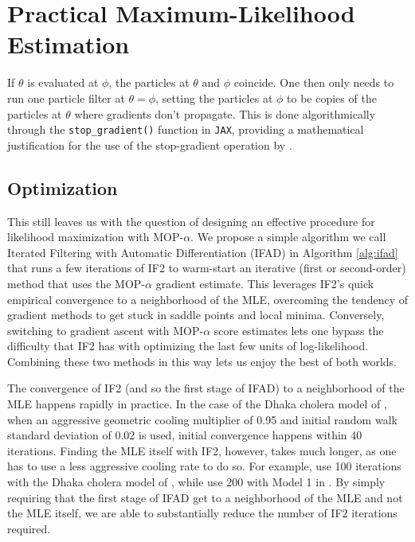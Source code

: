 \documentclass[9pt,twocolumn,pnasresearcharticle]{pnas-new}
\begin{document}
\section{Practical Maximum-Likelihood Estimation}


If $\theta$ is evaluated at $\phi$, the particles at $\theta$ and $\phi$ coincide. One then only needs to run one particle filter at $\theta=\phi$, setting the particles at $\phi$ to be copies of the particles at $\theta$ where gradients don't propagate. This is done algorithmically through the \texttt{stop\_gradient()} function in \texttt{JAX}, providing a mathematical justification for the use of the stop-gradient operation by \cite{scibior21}.

\subsection{Optimization}

This still leaves us with the question of designing an effective procedure for likelihood maximization with MOP-$\alpha$. We propose a simple algorithm we call Iterated Filtering with Automatic Differentiation (IFAD) in Algorithm \ref{alg:ifad} that runs a few iterations of IF2 to warm-start an iterative (first or second-order) method that uses the MOP-$\alpha$ gradient estimate. This leverages IF2's quick empirical convergence to a neighborhood of the MLE, overcoming the tendency of gradient methods to get stuck in saddle points and local minima. Conversely, switching to gradient ascent with MOP-$\alpha$ score estimates lets one bypass the difficulty that IF2 has with optimizing the last few units of log-likelihood. Combining these two methods in this way lets us enjoy the best of both worlds.

The  convergence of IF2 (and so the first stage of IFAD) to a neighborhood of the MLE happens rapidly in practice. 
In the case of the Dhaka cholera model of \cite{king08}, when an aggressive geometric cooling multiplier of 0.95 and initial random walk standard deviation of 0.02 is used, initial convergence happens within 40 iterations. 
Finding the MLE itself with IF2, however, takes much longer, as one has to use a less aggressive cooling rate to do so. 
For example, \cite{ionides15} use 100 iterations with the Dhaka cholera model of \cite{king08}, while \cite{wheeler23} use 200 with Model 1 in \cite{lee20}. 
By simply requiring that the first stage of IFAD get to a neighborhood of the MLE and not the MLE itself, we are able to substantially reduce the number of IF2 iterations required. 
\end{document}
